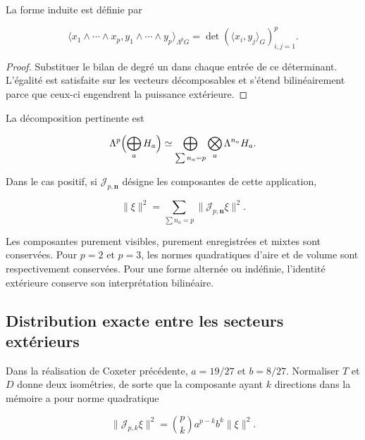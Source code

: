 La forme induite est définie par



\[
\langle x_1\wedge\cdots\wedge x_p,
y_1\wedge\cdots\wedge y_p\rangle_{\Lambda^pG}
=\det(\langle x_i,y_j\rangle_G)_{i,j=1}^p.
\]



\begin{proof}
Substituer le bilan de degré un dans chaque entrée de ce déterminant. L’égalité est satisfaite sur les vecteurs décomposables et s’étend bilinéairement parce que ceux-ci engendrent la puissance extérieure.
\end{proof}

La décomposition pertinente est



\[
\Lambda^p\Bigl(\bigoplus_aH_a\Bigr)
\simeq\bigoplus_{\sum n_a=p}\bigotimes_a\Lambda^{n_a}H_a.
\]



Dans le cas positif, si
\(\mathcal J_{p,\mathbf n}\) désigne les composantes de cette application,



\begin{equation}
\boxed{\|\xi\|^2=\sum_{\sum n_a=p}
\|\mathcal J_{p,\mathbf n}\xi\|^2.}
\label{x_reciprocidad:nuc11:eq:21}
\end{equation}



Les composantes purement visibles, purement
enregistrées et mixtes sont conservées.
Pour \(p=2\) et \(p=3\), les normes
quadratiques d’aire et de volume sont respectivement conservées.
Pour une forme alternée ou indéfinie, l’identité extérieure
conserve son interprétation bilinéaire.

\subsection{Distribution exacte entre les secteurs extérieurs}

Dans la réalisation de Coxeter précédente,
\(a=19/27\) et \(b=8/27\).
Normaliser \(T\) et \(D\) donne deux isométries, de sorte que la
composante ayant \(k\) directions dans la mémoire a pour norme quadratique



\begin{equation}
\boxed{
\|\mathcal J_{p,k}\xi\|^2=
\binom pk a^{p-k}b^k\|\xi\|^2.
}
\label{x_reciprocidad:nuc11:eq:22}
\end{equation}



